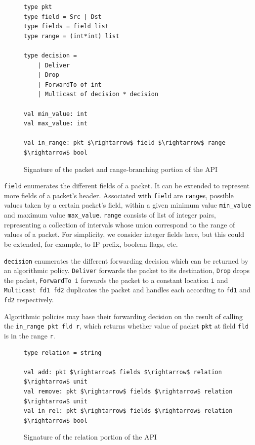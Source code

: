 \documentclass[nocopyrightspace]{sigplanconf}
\begin{document}
\begin{figure}[ht]
  \begin{lstlisting}[mathescape]
type pkt
type field = Src | Dst 
type fields = field list
type range = (int*int) list

type decision =
	| Deliver
	| Drop
	| ForwardTo of int
	| Multicast of decision * decision

val min_value: int 
val max_value: int

val in_range: pkt $\rightarrow$ field $\rightarrow$ range $\rightarrow$ bool
\end{lstlisting}

\caption{Signature of the packet and range-branching portion of the API}
\label{fig:range_api}
\end{figure}


\lstinline|field| enumerates the different fields of a packet. It can be extended to represent more fields of a packet's header. Associated with \lstinline|field| are \lstinline|range|s, possible values taken by a certain packet's field, within a given minimum value \lstinline|min_value| and maximum value \lstinline|max_value|. \lstinline|range| consists of list of integer pairs, representing a collection of intervals whose union correspond to the range of values of a packet. For simplicity, we consider integer fields here, but this could be extended, for example, to IP prefix, boolean flags, etc.

\lstinline|decision| enumerates the different forwarding decision which can be returned by an algorithmic policy. \lstinline|Deliver| forwards the packet to its destination, \lstinline|Drop| drops the packet, \lstinline|ForwardTo i| forwards the packet to a constant location \lstinline|i| and \lstinline|Multicast fd1 fd2| duplicates the packet and handles each according to \lstinline|fd1| and \lstinline|fd2| respectively.

Algorithmic policies may base their forwarding decision on the result of calling the \lstinline|in_range pkt fld r|, which returns whether value of packet \lstinline|pkt| at field \lstinline|fld| is in the range \lstinline|r|.

\begin{figure}[ht]
  \begin{lstlisting}[mathescape]
type relation = string

val add: pkt $\rightarrow$ fields $\rightarrow$ relation $\rightarrow$ unit
val remove: pkt $\rightarrow$ fields $\rightarrow$ relation $\rightarrow$ unit
val in_rel: pkt $\rightarrow$ fields $\rightarrow$ relation $\rightarrow$ bool
\end{lstlisting}

\caption{Signature of the relation portion of the API}
\label{fig:rel_api}
\end{figure}
\end{document}
